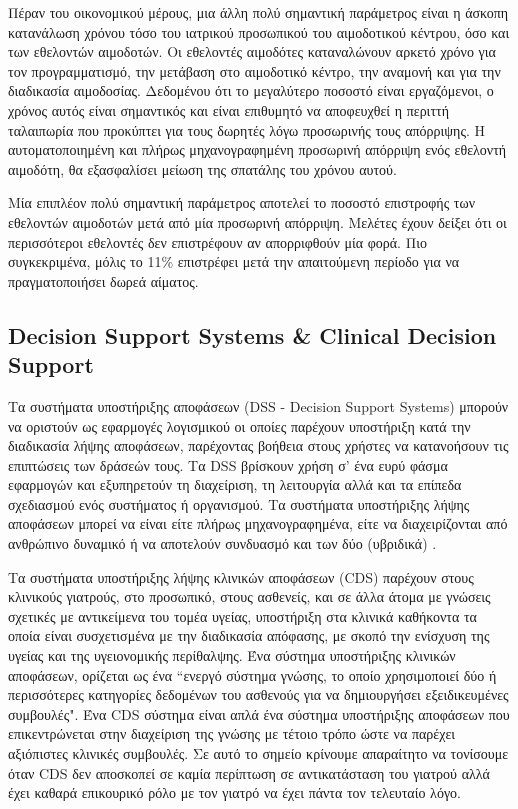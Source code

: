 		Πέραν του οικονομικού μέρους, μια άλλη πολύ σημαντική παράμετρος είναι η άσκοπη κατανάλωση χρόνου τόσο του ιατρικού προσωπικού του αιμοδοτικού κέντρου, όσο και των εθελοντών αιμοδοτών. Οι εθελοντές αιμοδότες καταναλώνουν αρκετό χρόνο για τον προγραμματισμό, την μετάβαση στο αιμοδοτικό κέντρο, την αναμονή και για την διαδικασία αιμοδοσίας.  Δεδομένου ότι το μεγαλύτερο ποσοστό είναι εργαζόμενοι, ο χρόνος αυτός είναι σημαντικός και είναι επιθυμητό να αποφευχθεί η περιττή ταλαιπωρία που προκύπτει για τους δωρητές λόγω προσωρινής τους απόρριψης. Η αυτοματοποιημένη και πλήρως μηχανογραφημένη προσωρινή απόρριψη ενός εθελοντή αιμοδότη, θα εξασφαλίσει μείωση της σπατάλης του χρόνου αυτού.
		
		Μία επιπλέον πολύ σημαντική παράμετρος αποτελεί το ποσοστό επιστροφής των εθελοντών αιμοδοτών μετά από μία προσωρινή απόρριψη. Μελέτες έχουν δείξει ότι οι περισσότεροι εθελοντές δεν επιστρέφουν αν απορριφθούν μία φορά. Πιο συγκεκριμένα, μόλις το 11\% επιστρέφει μετά την απαιτούμενη περίοδο για να πραγματοποιήσει δωρεά αίματος\cite{halperin1998effect}.
	
		
	\subsection{Decision Support Systems \& Clinical Decision Support}
		Τα συστήματα υποστήριξης αποφάσεων (DSS - Decision Support Systems) μπορούν να οριστούν ως εφαρμογές λογισμικού οι οποίες παρέχουν υποστήριξη κατά την διαδικασία λήψης αποφάσεων, παρέχοντας βοήθεια στους χρήστες να κατανοήσουν τις επιπτώσεις των δράσεών τους\cite{french2000decision}. Τα DSS βρίσκουν χρήση σ' ένα ευρύ φάσμα εφαρμογών και εξυπηρετούν τη διαχείριση, τη λειτουργία αλλά και τα επίπεδα σχεδιασμού ενός συστήματος ή οργανισμού. Τα συστήματα υποστήριξης λήψης αποφάσεων μπορεί να είναι είτε πλήρως μηχανογραφημένα, είτε να διαχειρίζονται από ανθρώπινο δυναμικό  ή να αποτελούν συνδυασμό και των δύο (υβριδικά) \cite{miller}. 
		
		Τα συστήματα υποστήριξης λήψης κλινικών αποφάσεων (CDS) παρέχουν στους κλινικούς γιατρούς, στο προσωπικό, στους ασθενείς, και σε άλλα άτομα με γνώσεις σχετικές με αντικείμενα του τομέα υγείας, υποστήριξη στα κλινικά καθήκοντα τα οποία είναι συσχετισμένα με την διαδικασία απόφασης, με σκοπό  την ενίσχυση της υγείας και της υγειονομικής περίθαλψης\cite{clinicalDecision}. Ένα σύστημα υποστήριξης κλινικών αποφάσεων, ορίζεται ως ένα ``ενεργό σύστημα γνώσης, το οποίο χρησιμοποιεί δύο ή περισσότερες κατηγορίες δεδομένων του ασθενούς για να δημιουργήσει εξειδικευμένες συμβουλές". Ένα CDS σύστημα είναι απλά ένα σύστημα υποστήριξης αποφάσεων που επικεντρώνεται στην διαχείριση της γνώσης με τέτοιο τρόπο ώστε να παρέχει αξιόπιστες κλινικές συμβουλές. Σε αυτό το σημείο κρίνουμε απαραίτητο να τονίσουμε όταν CDS δεν αποσκοπεί σε καμία περίπτωση σε αντικατάσταση του γιατρού αλλά έχει καθαρά επικουρικό ρόλο με τον γιατρό να έχει πάντα τον τελευταίο λόγο\cite{miller}. 
		

